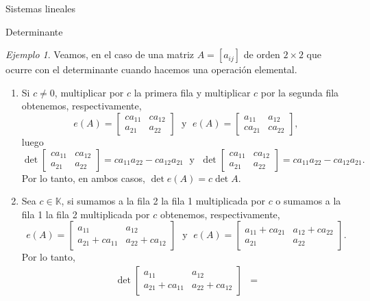 \documentclass[a4paper,12pt,twoside,spanish,reqno]{amsbook}
\numberwithin{equation}{section}
\theoremstyle{definition}
\theoremstyle{remark}
\newtheorem*{ejemplo*}{Ejemplo}
\newcommand{\K}{\mathbb K}
\begin{document}
\begin{chapter}{Sistemas lineales}
\begin{section}{Determinante}
    \begin{ejemplo*} Veamos,  en el caso de una matriz $A= [a_{ij}]$ de orden  $2 \times 2$ que ocurre con el determinante cuando hacemos una operación elemental. 
            \begin{enumerate}
            \item Si $c \not=0$, multiplicar por  $c$ la primera fila y multiplicar $c$ por la segunda fila obtenemos, respectivamente,
            \begin{equation*}
            e(A) = \begin{bmatrix} ca_{11}& ca_{12}\\ a_{21}&a_{22}\end{bmatrix}\;\text{ y }\; e(A) = \begin{bmatrix} a_{11}& a_{12}\\ ca_{21}&ca_{22}\end{bmatrix},
            \end{equation*}
            luego 
            \begin{equation*}
            \det \begin{bmatrix} ca_{11}& ca_{12}\\ a_{21}&a_{22}\end{bmatrix} = ca_{11}a_{22} - ca_{12}a_{21}\;\text{ y }\;\det \begin{bmatrix} ca_{11}& ca_{12}\\ a_{21}&a_{22}\end{bmatrix} = ca_{11}a_{22} - ca_{12}a_{21}. 
            \end{equation*}
            Por lo tanto,  en ambos casos, $\det e(A) = c \det A$. 
            \item Sea  $c \in \K$, si sumamos a la fila 2 la fila 1 multiplicada por $c$ o sumamos a la fila 1  la fila 2 multiplicada por $c$ obtenemos, respectivamente,
            \begin{equation*}
            e(A) = \begin{bmatrix} a_{11}& a_{12}\\ a_{21}+ ca_{11}&a_{22}+ ca_{12}\end{bmatrix}\;\text{ y }\; 
            e(A) = \begin{bmatrix} a_{11} + ca_{21}& a_{12} + ca_{22}\\ a_{21}&a_{22}\end{bmatrix}.
            \end{equation*}
            Por lo tanto, 
            \begin{align*}
                \det \begin{bmatrix} a_{11}& a_{12}\\ a_{21}+ ca_{11}&a_{22}+ ca_{12}\end{bmatrix} &=

\end{align*}
\end{enumerate}
\end{ejemplo*}
\end{section}
\end{chapter}
\end{document}
